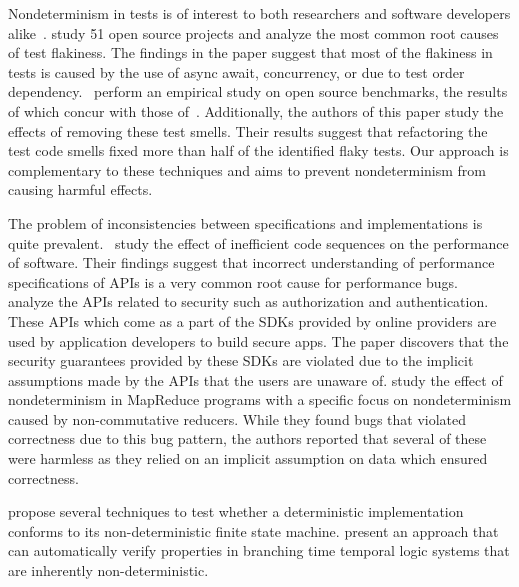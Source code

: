 Nondeterminism in tests is of interest to both
researchers and software developers alike~\cite{Fowler,Sudarshan}.
\cite{LuoHEM2014} study 51 open source projects and analyze the most common root causes of
test flakiness. The findings in the paper suggest that most of the flakiness in tests is caused by
the use of async await, concurrency, or due to test order dependency.~\cite{Plotkin:1993:LPP:645891.671433}
perform an empirical study on open source benchmarks, the results of which concur with those of~\cite{LuoHEM2014}.
Additionally, the authors of this paper study the effects of removing these test smells. Their results suggest that
refactoring the test code smells fixed more than half of the identified flaky tests. Our approach is complementary to
these techniques and aims to prevent nondeterminism from causing harmful effects. 

The problem of inconsistencies between specifications and implementations
is quite prevalent.~\cite{Jin:2012:UDR:2254064.2254075} study the effect of inefficient code sequences on the performance of software.
Their findings suggest that incorrect understanding of performance specifications of APIs is a very common root cause for
performance bugs. ~\cite{Rui:2013:180377} analyze the APIs related to security such as authorization and authentication.
These APIs which come as a part of the SDKs provided by online providers are used by application developers to 
build secure apps. The paper discovers that the security guarantees provided by these SDKs are violated due to
the implicit assumptions made by the APIs that the users are unaware of. \cite{Xiao:2014:NMC:2591062.2591177}
study the effect of nondeterminism in MapReduce programs with a specific focus on nondeterminism caused by
non-commutative reducers. While they found bugs that violated correctness due to this bug pattern,
the authors reported that several of these were harmless as they relied on an implicit assumption on data
which ensured correctness. 

\cite{Petrenko1996,Petrenko:1993:NSM:648128.761244,Savor:1997:639710,Hierons:2004:TCD:1040993.1040998} propose several techniques to test whether a
deterministic implementation conforms to its non-deterministic finite state machine.
\cite{Cook:2013:RNP:2491956.2491969} present an approach that can automatically verify properties
in branching time temporal logic systems that are inherently non-deterministic.

